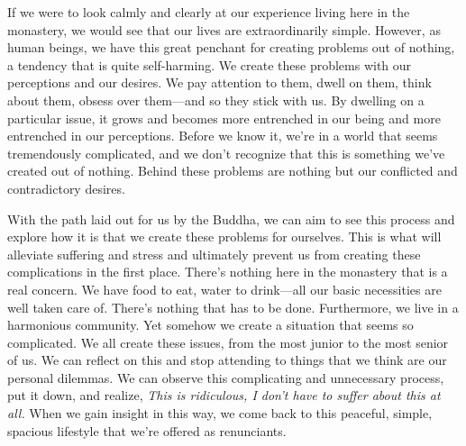 
If we were to look calmly and clearly at our experience living here in 
the monastery, we would see that our lives are extraordinarily simple. 
However, as human beings, we have this great penchant for creating 
problems out of nothing, a tendency that is quite self-harming. We 
create these problems with our perceptions and our desires. We pay 
attention to them, dwell on them, think about them, obsess over 
them---and so they stick with us. By dwelling on a particular issue, it 
grows and becomes more entrenched in our being and more entrenched in 
our perceptions. Before we know it, we're in a world that seems 
tremendously complicated, and we don't recognize that this is something 
we've created out of nothing. Behind these problems are nothing but our 
conflicted and contradictory desires.

With the path laid out for us by the Buddha, we can aim to see this 
process and explore how it is that we create these problems for 
ourselves. This is what will alleviate suffering and stress and 
ultimately prevent us from creating these complications in the first 
place. There's nothing here in the monastery that is a real concern. We 
have food to eat, water to drink---all our basic necessities are well 
taken care of. There's nothing that has to be done. Furthermore, we 
live in a harmonious community. Yet somehow we create a situation that 
seems so complicated. We all create these issues, from the most junior 
to the most senior of us. We can reflect on this and stop attending to 
things that we think are our personal dilemmas. We can observe this 
complicating and unnecessary process, put it down, and realize, 
\emph{This is ridiculous, I don't have to suffer about this at all.} 
When we gain insight in this way, we come back to this peaceful, 
simple, spacious lifestyle that we're offered as renunciants.

